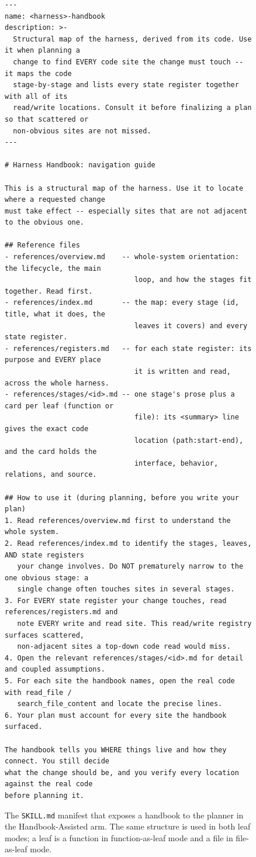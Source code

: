 \documentclass[]{ailab}
\newcommand{\hbsmall}{\textsf{function-as-leaf}}
\newcommand{\hblarge}{\textsf{file-as-leaf}}
\begin{document}
\begin{figure}[t!]
\begin{lstlisting}[style=skillbox]
---
name: <harness>-handbook
description: >-
  Structural map of the harness, derived from its code. Use it when planning a
  change to find EVERY code site the change must touch -- it maps the code
  stage-by-stage and lists every state register together with all of its
  read/write locations. Consult it before finalizing a plan so that scattered or
  non-obvious sites are not missed.
---

# Harness Handbook: navigation guide

This is a structural map of the harness. Use it to locate where a requested change
must take effect -- especially sites that are not adjacent to the obvious one.

## Reference files
- references/overview.md    -- whole-system orientation: the lifecycle, the main
                               loop, and how the stages fit together. Read first.
- references/index.md       -- the map: every stage (id, title, what it does, the
                               leaves it covers) and every state register.
- references/registers.md   -- for each state register: its purpose and EVERY place
                               it is written and read, across the whole harness.
- references/stages/<id>.md -- one stage's prose plus a card per leaf (function or
                               file): its <summary> line gives the exact code
                               location (path:start-end), and the card holds the
                               interface, behavior, relations, and source.

## How to use it (during planning, before you write your plan)
1. Read references/overview.md first to understand the whole system.
2. Read references/index.md to identify the stages, leaves, AND state registers
   your change involves. Do NOT prematurely narrow to the one obvious stage: a
   single change often touches sites in several stages.
3. For EVERY state register your change touches, read references/registers.md and
   note EVERY write and read site. This read/write registry surfaces scattered,
   non-adjacent sites a top-down code read would miss.
4. Open the relevant references/stages/<id>.md for detail and coupled assumptions.
5. For each site the handbook names, open the real code with read_file /
   search_file_content and locate the precise lines.
6. Your plan must account for every site the handbook surfaced.

The handbook tells you WHERE things live and how they connect. You still decide
what the change should be, and you verify every location against the real code
before planning it.
\end{lstlisting}
\caption{The \texttt{SKILL.md} manifest that exposes a handbook to the planner in the Handbook-Assisted arm. The same structure is used in both leaf modes; a leaf is a function in \hbsmall{} mode and a file in \hblarge{} mode.}
\label{lst:skill}
\end{figure}
\end{document}
